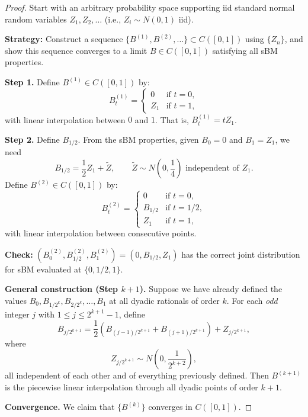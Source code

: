 \begin{proof}
    Start with an arbitrary probability space supporting iid standard normal random variables $Z_1, Z_2, \ldots$ (i.e., $Z_i \sim N(0,1)$ iid).

    \textbf{Strategy:} Construct a sequence $\{B^{(1)}, B^{(2)}, \ldots\} \subset C([0,1])$ using $\{Z_n\}$, and show this sequence converges to a limit $B \in C([0,1])$ satisfying all sBM properties.

    \medskip
    \textbf{Step 1.} Define $B^{(1)} \in C([0,1])$ by:
    \[
        B^{(1)}_t =
        \begin{cases}
            0 & \text{if } t = 0,\\
            Z_1 & \text{if } t = 1,
        \end{cases}
    \]
    with linear interpolation between $0$ and $1$. That is, $B^{(1)}_t = t Z_1$.

    \medskip
    \textbf{Step 2.} Define $B_{1/2}$. From the sBM properties, given $B_0 = 0$ and $B_1 = Z_1$, we need
    \[
        B_{1/2} = \frac{1}{2} Z_1 + \widetilde{Z}, \qquad \widetilde{Z} \sim N\!\left(0, \frac{1}{4}\right) \text{ independent of } Z_1.
    \]
    Define $B^{(2)} \in C([0,1])$ by:
    \[
        B^{(2)}_t =
        \begin{cases}
            0 & \text{if } t = 0,\\
            B_{1/2} & \text{if } t = 1/2,\\
            Z_1 & \text{if } t = 1,
        \end{cases}
    \]
    with linear interpolation between consecutive points.

    \textbf{Check:} $(B^{(2)}_0, B^{(2)}_{1/2}, B^{(2)}_1) = (0, B_{1/2}, Z_1)$ has the correct joint distribution for sBM evaluated at $\{0, 1/2, 1\}$.

    \medskip
    \textbf{General construction (Step $k+1$).} Suppose we have already defined the values $B_0, B_{1/2^k}, B_{2/2^k}, \ldots, B_1$ at all dyadic rationals of order $k$. For each \emph{odd} integer $j$ with $1 \leq j \leq 2^{k+1} - 1$, define
    \[
        B_{j/2^{k+1}} = \frac{1}{2}\!\left(B_{(j-1)/2^{k+1}} + B_{(j+1)/2^{k+1}}\right) + Z_{j/2^{k+1}},
    \]
    where
    \[
        Z_{j/2^{k+1}} \sim N\!\left(0, \frac{1}{2^{k+2}}\right),
    \]
    all independent of each other and of everything previously defined. Then $B^{(k+1)}$ is the piecewise linear interpolation through all dyadic points of order $k+1$.

    \medskip
    \textbf{Convergence.} We claim that $\{B^{(k)}\}$ converges in $C([0,1])$.


\end{proof}
